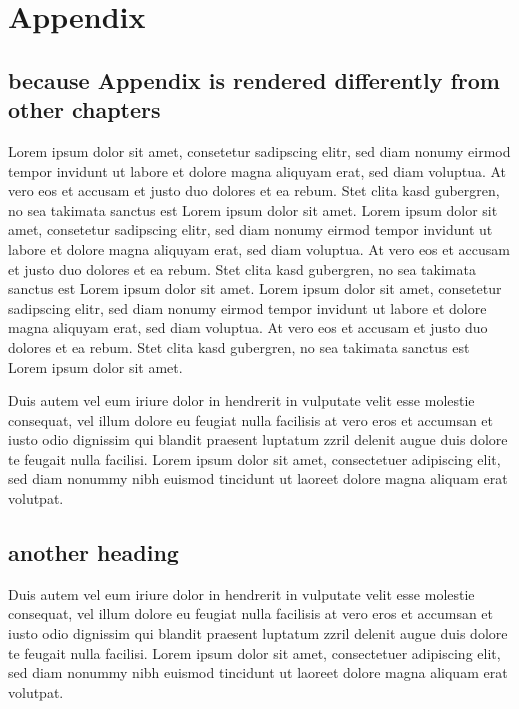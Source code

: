 \documentclass[10pt,twoside,twocolumn,openany,nodeprecatedcode]{dndbook}
\begin{document}
\chapter{Appendix}

\section{because Appendix is rendered differently from other chapters}

Lorem ipsum dolor sit amet, consetetur sadipscing elitr, sed diam nonumy eirmod tempor invidunt ut labore et dolore magna aliquyam erat, sed diam voluptua. At vero eos et accusam et justo duo dolores et ea rebum. Stet clita kasd gubergren, no sea takimata sanctus est Lorem ipsum dolor sit amet. Lorem ipsum dolor sit amet, consetetur sadipscing elitr, sed diam nonumy eirmod tempor invidunt ut labore et dolore magna aliquyam erat, sed diam voluptua. At vero eos et accusam et justo duo dolores et ea rebum. Stet clita kasd gubergren, no sea takimata sanctus est Lorem ipsum dolor sit amet. Lorem ipsum dolor sit amet, consetetur sadipscing elitr, sed diam nonumy eirmod tempor invidunt ut labore et dolore magna aliquyam erat, sed diam voluptua. At vero eos et accusam et justo duo dolores et ea rebum. Stet clita kasd gubergren, no sea takimata sanctus est Lorem ipsum dolor sit amet.

Duis autem vel eum iriure dolor in hendrerit in vulputate velit esse molestie consequat, vel illum dolore eu feugiat nulla facilisis at vero eros et accumsan et iusto odio dignissim qui blandit praesent luptatum zzril delenit augue duis dolore te feugait nulla facilisi. Lorem ipsum dolor sit amet, consectetuer adipiscing elit, sed diam nonummy nibh euismod tincidunt ut laoreet dolore magna aliquam erat volutpat.

\section{another heading}

Duis autem vel eum iriure dolor in hendrerit in vulputate velit esse molestie consequat, vel illum dolore eu feugiat nulla facilisis at vero eros et accumsan et iusto odio dignissim qui blandit praesent luptatum zzril delenit augue duis dolore te feugait nulla facilisi. Lorem ipsum dolor sit amet, consectetuer adipiscing elit, sed diam nonummy nibh euismod tincidunt ut laoreet dolore magna aliquam erat volutpat.
\end{document}

